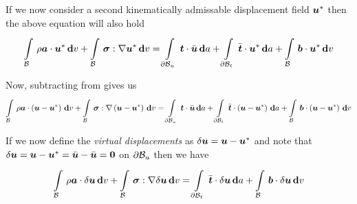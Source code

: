 If we now consider a second kinematically admissable displacement field
$\boldsymbol{u}^{*}$ then the above equation will also hold \ie
\begin{equation}
  \gint{\embedmanifold{B}}{}{\dotprod{\rho\vectr{a}}{\vectr{u}^{*}}}{v}+
  \gint{\embedmanifold{B}}{}{\doubledotprod{\tensor{\sigma}}{\gradient{}{\vectr{u}^{*}}}}{v}=
  \gint{\boundary{\embedmanifold{B}}_{u}}{}{\dotprod{\vectr{t}}{\bar{\vectr{u}}}}{a}+
  \gint{\boundary{\embedmanifold{B}}_{t}}{}{\dotprod{\bar{\vectr{t}}}{\vectr{u}^{*}}}{a}+
  \gint{\embedmanifold{B}}{}{\dotprod{\vectr{b}}{\vectr{u}^{*}}}{v}
  \label{eqn:virtualworkdisp2}
\end{equation}

Now, subtracting  from
 gives us
\begin{equation}
  \gint{\embedmanifold{B}}{}{\dotprod{\rho\vectr{a}}{\pbrac{\vectr{u}-\vectr{u}^{*}}}}{v}+
  \gint{\embedmanifold{B}}{}{\doubledotprod{\tensor{\sigma}}{\gradient{}{\pbrac{\vectr{u}-\vectr{u}^{*}}}}}{v}=
  \gint{\boundary{\embedmanifold{B}}_{u}}{}{\dotprod{\vectr{t}}{\bar{\vectr{u}}}}{a}+
  \gint{\boundary{\embedmanifold{B}}_{t}}{}{\dotprod{\bar{\vectr{t}}}{\pbrac{\vectr{u}-\vectr{u}^{*}}}}{a}+
  \gint{\embedmanifold{B}}{}{\dotprod{\vectr{b}}{\pbrac{\vectr{u}-\vectr{u}^{*}}}}{v}
  \label{eqn:virtualworkdispdiff}
\end{equation}

If we now define the \emph{virtual displacements} as
$\delta\boldsymbol{u}=\boldsymbol{u}-\boldsymbol{u}^{*}$ and note that
$\delta\boldsymbol{u}=\boldsymbol{u}-\boldsymbol{u}^{*}=\bar{\boldsymbol{u}}-\bar{\boldsymbol{u}}=\boldsymbol{0}$
on $ \partial{\ensuremath{ \mathcal{B} }} _{u}$ then we have
\begin{equation}
  \gint{\embedmanifold{B}}{}{\dotprod{\rho\vectr{a}}{\delta\vectr{u}}}{v}+
  \gint{\embedmanifold{B}}{}{\doubledotprod{\tensor{\sigma}}{\gradient{}{\delta\vectr{u}}}}{v}=
  \gint{\boundary{\embedmanifold{B}}_{t}}{}{\dotprod{\bar{\vectr{t}}}{\delta\vectr{u}}}{a}+
  \gint{\embedmanifold{B}}{}{\dotprod{\vectr{b}}{\delta\vectr{u}}}{v}
  \label{eqn:virtualworkstatment}
\end{equation}

